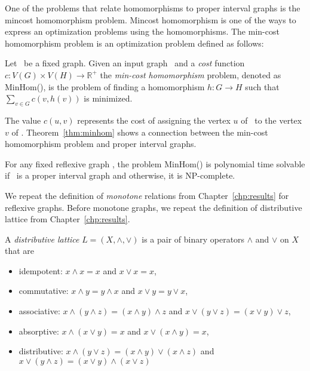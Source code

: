 One of the problems that relate homomorphisms to proper interval graphs is the mincost homomorphism problem.
Mincost homomorphism is one of the ways to express an optimization problems using the homomorphisms.
The min-cost homomorphism problem is an optimization problem defined as follows:

\begin{defi} [MinHom]
Let \mH\ be a fixed graph. Given an input graph \mG\ and a \emph{cost} function
\(c: V(G) \times V(H) \to \mathbb{R}^+\) the \emph{min-cost homomorphism} problem,
denoted as MinHom(\mH), is the problem of finding a homomorphism 
\(h:G\to H\) such that \(\sum_{v\in G} c(v, h(v))\) is minimized.
\end{defi}

The value \(c(u,v)\) represents the cost of assigning the vertex \(u\) of \mG\ to the vertex \(v\) of \mH\@.
Theorem~\ref{thm:minhom} shows a connection between the min-cost homomorphism problem 
and proper interval graphs.

\begin{theorem}  \label{thm:minhom}
For any fixed reflexive graph \mH, the problem MinHom(\mH) is polynomial time solvable if
\mH\ is a proper interval graph and otherwise, it is NP-complete.
\end{theorem}

We repeat the definition of \emph{monotone} relations from Chapter~\ref{chp:results}
for reflexive graphs. Before monotone graphs, we repeat the definition of distributive lattice from Chapter~\ref{chp:results}\@.

\begin{defi} 
A \emph{distributive lattice} \(L=(X,\wedge,\vee)\) is a pair of binary operators \(\wedge\)
and \(\vee\) on \(X\) that are 
\begin{itemize}
\item idempotent: \(x \wedge x = x\) and \(x \vee x = x\),
\item commutative: \(x \wedge y = y \wedge x\) and \(x \vee y = y \vee x\),
\item associative: \(x \wedge (y \wedge z) = (x \wedge y) \wedge z\) and 
\(x \vee (y \vee z) = (x \vee y) \vee z\),
\item absorptive: \(x \wedge (x\vee y) = x\) and \(x \vee (x \wedge y) = x\),
\item distributive: \(x \wedge (y \vee z) = (x \wedge y) \vee (x \wedge z)\) and
\(x \vee (y \wedge z) = (x \vee y) \wedge (x \vee z)\)
\end{itemize}
\end{defi}

